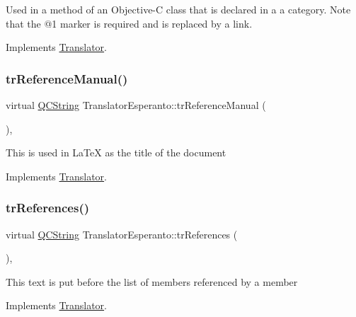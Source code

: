 Used in a method of an Objective-\/C class that is declared in a a category. Note that the @1 marker is required and is replaced by a link. 

Implements \mbox{\hyperlink{class_translator}{Translator}}.

\mbox{\label{class_translator_esperanto_a9b8a1f51e09f673a37d428d7b78f2bbe}} 
\subsubsection{\texorpdfstring{trReferenceManual()}{trReferenceManual()}}
{\footnotesize\ttfamily virtual \mbox{\hyperlink{class_q_c_string}{Q\+C\+String}} Translator\+Esperanto\+::tr\+Reference\+Manual (\begin{DoxyParamCaption}{ }\end{DoxyParamCaption})\hspace{0.3cm}{\ttfamily [inline]}, {\ttfamily [virtual]}}

This is used in La\+TeX as the title of the document 

Implements \mbox{\hyperlink{class_translator}{Translator}}.

\mbox{\label{class_translator_esperanto_a68c7c42c8d6d7264aa411cb4b2d6d28e}} 
\subsubsection{\texorpdfstring{trReferences()}{trReferences()}}
{\footnotesize\ttfamily virtual \mbox{\hyperlink{class_q_c_string}{Q\+C\+String}} Translator\+Esperanto\+::tr\+References (\begin{DoxyParamCaption}{ }\end{DoxyParamCaption})\hspace{0.3cm}{\ttfamily [inline]}, {\ttfamily [virtual]}}

This text is put before the list of members referenced by a member 

Implements \mbox{\hyperlink{class_translator}{Translator}}.

\mbox{\label{class_translator_esperanto_abd97eb0cf95223e5c7190ddf96b05678}} 
